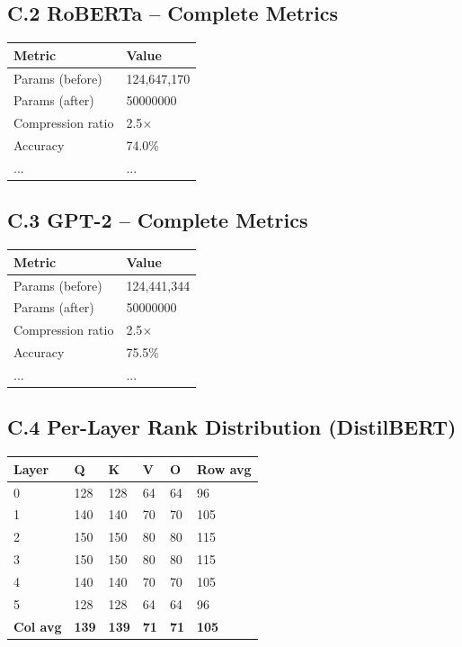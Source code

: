 \subsection{C.2 RoBERTa -- Complete Metrics}

\begin{table}[H]
\centering
\small
\begin{tabular}{ll}
\toprule
\textbf{Metric} & \textbf{Value} \\
\midrule
Params (before) & 124,647,170 \\
Params (after) & 50000000 \\
Compression ratio & 2.5$\times$ \\
Accuracy & 74.0\% \\
... & ... \\
\bottomrule
\end{tabular}
\end{table}

\subsection{C.3 GPT-2 -- Complete Metrics}

\begin{table}[H]
\centering
\small
\begin{tabular}{ll}
\toprule
\textbf{Metric} & \textbf{Value} \\
\midrule
Params (before) & 124,441,344 \\
Params (after) & 50000000 \\
Compression ratio & 2.5$\times$ \\
Accuracy & 75.5\% \\
... & ... \\
\bottomrule
\end{tabular}
\end{table}

\subsection{C.4 Per-Layer Rank Distribution (DistilBERT)}

\begin{table}[H]
\centering
\small
\begin{tabular}{llllll}
\toprule
\textbf{Layer} & \textbf{Q} & \textbf{K} & \textbf{V} & \textbf{O} & \textbf{Row avg} \\
\midrule
0 & 128 & 128 & 64 & 64 & 96 \\
1 & 140 & 140 & 70 & 70 & 105 \\
2 & 150 & 150 & 80 & 80 & 115 \\
3 & 150 & 150 & 80 & 80 & 115 \\
4 & 140 & 140 & 70 & 70 & 105 \\
5 & 128 & 128 & 64 & 64 & 96 \\
\textbf{Col avg} & \textbf{139} & \textbf{139} & \textbf{71} & \textbf{71} & \textbf{105} \\
\bottomrule
\end{tabular}
\end{table}

